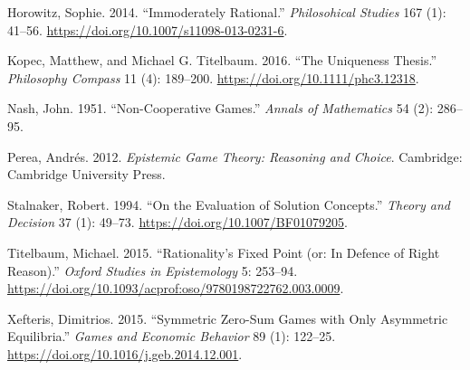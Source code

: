 \documentclass[12pt,]{article}
\begin{document}
\leavevmode\hypertarget{ref-Horowitz2014}{}%
Horowitz, Sophie. 2014. ``Immoderately Rational.'' \emph{Philosohical Studies} 167 (1): 41--56. \url{https://doi.org/10.1007/s11098-013-0231-6}.

\leavevmode\hypertarget{ref-KopecTitelbaum2016}{}%
Kopec, Matthew, and Michael G. Titelbaum. 2016. ``The Uniqueness Thesis.'' \emph{Philosophy Compass} 11 (4): 189--200. \url{https://doi.org/10.1111/phc3.12318}.

\leavevmode\hypertarget{ref-Nash1951}{}%
Nash, John. 1951. ``Non-Cooperative Games.'' \emph{Annals of Mathematics} 54 (2): 286--95.

\leavevmode\hypertarget{ref-Perea2012}{}%
Perea, Andrés. 2012. \emph{Epistemic Game Theory: Reasoning and Choice}. Cambridge: Cambridge University Press.

\leavevmode\hypertarget{ref-Stalnaker1994}{}%
Stalnaker, Robert. 1994. ``On the Evaluation of Solution Concepts.'' \emph{Theory and Decision} 37 (1): 49--73. \url{https://doi.org/10.1007/BF01079205}.

\leavevmode\hypertarget{ref-Titelbaum2015}{}%
Titelbaum, Michael. 2015. ``Rationality's Fixed Point (or: In Defence of Right Reason).'' \emph{Oxford Studies in Epistemology} 5: 253--94. \url{https://doi.org/10.1093/acprof:oso/9780198722762.003.0009}.

\leavevmode\hypertarget{ref-Xefteris2015}{}%
Xefteris, Dimitrios. 2015. ``Symmetric Zero-Sum Games with Only Asymmetric Equilibria.'' \emph{Games and Economic Behavior} 89 (1): 122--25. \url{https://doi.org/10.1016/j.geb.2014.12.001}.
\end{document}

